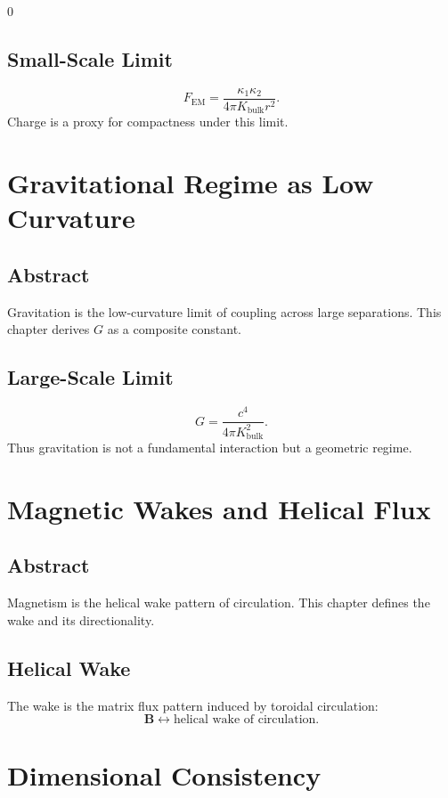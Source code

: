 0\documentclass[12pt]{book}
\begin{document}
\section{Small-Scale Limit}
\begin{equation}
F_{\text{EM}} = \frac{\kappa_1 \kappa_2}{4\pi K_{\text{bulk}} r^2}.
\end{equation}
Charge is a proxy for compactness under this limit.

\chapter{Gravitational Regime as Low Curvature}

\section*{Abstract}
Gravitation is the low-curvature limit of coupling across large separations. This chapter derives $G$
as a composite constant.

\section{Large-Scale Limit}
\begin{equation}
G = \frac{c^4}{4\pi K_{\text{bulk}}^2}.
\end{equation}
Thus gravitation is not a fundamental interaction but a geometric regime.

\chapter{Magnetic Wakes and Helical Flux}

\section*{Abstract}
Magnetism is the helical wake pattern of circulation. This chapter defines the wake and its directionality.

\section{Helical Wake}
The wake is the matrix flux pattern induced by toroidal circulation:
\begin{equation}
\mathbf{B} \leftrightarrow \text{helical wake of circulation}.
\end{equation}

\chapter{Dimensional Consistency}
\end{document}
